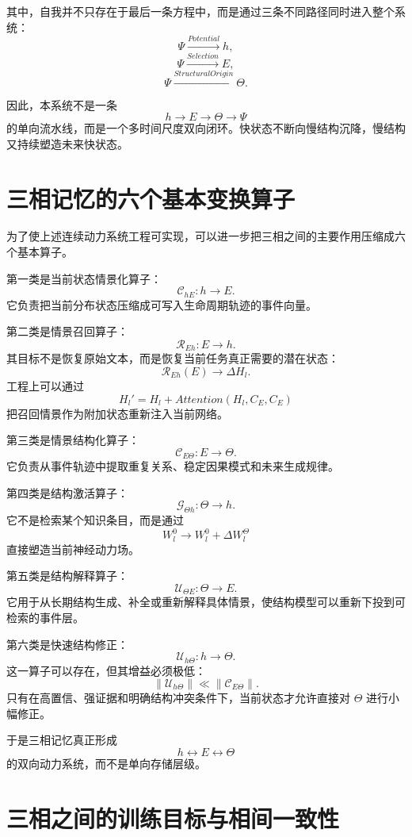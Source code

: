 其中，自我并不只存在于最后一条方程中，而是通过三条不同路径同时进入整个系统：
\[
\Psi
\xrightarrow{Potential}
h,
\]
\[
\Psi
\xrightarrow{Selection}
E,
\]
\[
\Psi
\xrightarrow{StructuralOrigin}
\Theta.
\]

因此，本系统不是一条
\[
h\rightarrow E\rightarrow\Theta\rightarrow\Psi
\]
的单向流水线，而是一个多时间尺度双向闭环。快状态不断向慢结构沉降，慢结构又持续塑造未来快状态。

\section{三相记忆的六个基本变换算子}

为了使上述连续动力系统工程可实现，可以进一步把三相之间的主要作用压缩成六个基本算子。

第一类是当前状态情景化算子：
\[
\mathcal{C}_{hE}:
h
\rightarrow
E.
\]
它负责把当前分布状态压缩成可写入生命周期轨迹的事件向量。

第二类是情景召回算子：
\[
\mathcal{R}_{Eh}:
E
\rightarrow
h.
\]
其目标不是恢复原始文本，而是恢复当前任务真正需要的潜在状态：
\[
\mathcal{R}_{Eh}(E)
\rightarrow
\Delta H_l.
\]
工程上可以通过
\[
H_l'
=
H_l
+
Attention
\left(
H_l,C_E,C_E
\right)
\]
把召回情景作为附加状态重新注入当前网络。

第三类是情景结构化算子：
\[
\mathcal{C}_{E\Theta}:
E
\rightarrow
\Theta.
\]
它负责从事件轨迹中提取重复关系、稳定因果模式和未来生成规律。

第四类是结构激活算子：
\[
\mathcal{G}_{\Theta h}:
\Theta
\rightarrow
h.
\]
它不是检索某个知识条目，而是通过
\[
W_l^0
\rightarrow
W_l^0+\Delta W_l^\Theta
\]
直接塑造当前神经动力场。

第五类是结构解释算子：
\[
\mathcal{U}_{\Theta E}:
\Theta
\rightarrow
E.
\]
它用于从长期结构生成、补全或重新解释具体情景，使结构模型可以重新下投到可检索的事件层。

第六类是快速结构修正：
\[
\mathcal{U}_{h\Theta}:
h
\rightarrow
\Theta.
\]
这一算子可以存在，但其增益必须极低：
\[
\left\|
\mathcal{U}_{h\Theta}
\right\|
\ll
\left\|
\mathcal{C}_{E\Theta}
\right\|.
\]
只有在高置信、强证据和明确结构冲突条件下，当前状态才允许直接对 $\Theta$ 进行小幅修正。

于是三相记忆真正形成
\[
h
\leftrightarrow
E
\leftrightarrow
\Theta
\]
的双向动力系统，而不是单向存储层级。

\section{三相之间的训练目标与相间一致性}

